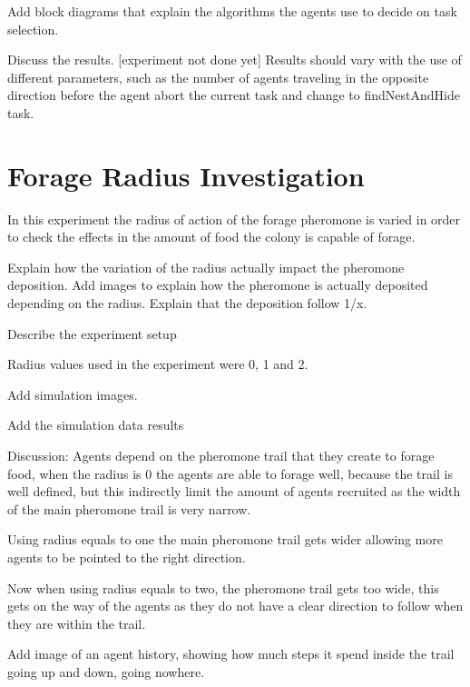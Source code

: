 Add block diagrams that explain the algorithms the agents use to decide on task selection.

Discuss the results. [experiment not done yet]
Results should vary with the use of different parameters, such as the number of agents traveling in the opposite direction before the agent abort the current task and change to findNestAndHide task.

\section{Forage Radius Investigation}
\label{sec:forage-radius-inv}

In this experiment the radius of action of the forage pheromone is varied in order to check the effects in the amount of food the colony is capable of forage.

Explain how the variation of the radius actually impact the pheromone deposition. Add images to explain how the pheromone is actually deposited depending on the radius. Explain that the deposition follow 1/x.

Describe the experiment setup

Radius values used in the experiment were 0, 1 and 2.

Add simulation images.

Add the simulation data results

Discussion: Agents depend on the pheromone trail that they create to forage food, when the radius is 0 the agents are able to forage well, because the trail is well defined, but this indirectly limit the amount of agents recruited as the width of the main pheromone trail is very narrow. 

Using radius equals to one the main pheromone trail gets wider allowing more agents to be pointed to the right direction.

Now when using radius equals to two, the pheromone trail gets too wide, this gets on the way of the agents as they do not have a clear direction to follow when they are within the trail. 

Add image of an agent history, showing how much steps it spend inside the trail going up and down, going nowhere.
